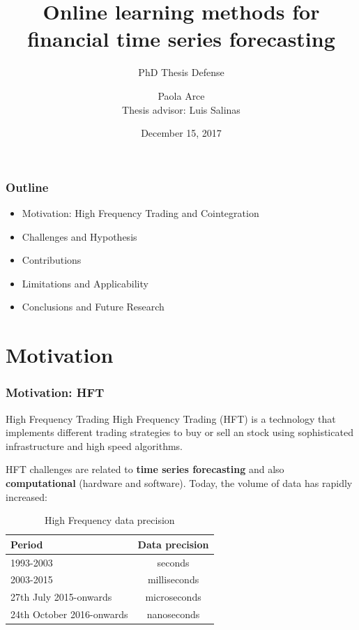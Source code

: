 \documentclass{beamer}
\author[Paola Arce]{Paola Arce \\ Thesis advisor: Luis Salinas}
\date{December 15, 2017}
\title[Thesis defense]{Online learning methods for financial time series forecasting}
\subtitle{PhD Thesis Defense}
\begin{document}
\begin{frame}[plain]
\titlepage
{}

\end{frame}

\begin{frame}
\frametitle{Outline}
\begin{itemize}
\item Motivation: High Frequency Trading and Cointegration
\item Challenges and Hypothesis
\item Contributions
\item Limitations and Applicability
\item Conclusions and Future Research
\end{itemize}
\end{frame}

\section{Motivation}


\begin{frame}
\frametitle{Motivation: HFT}
\begin{alertblock}{High Frequency Trading}
High Frequency Trading (HFT) is a technology that implements different trading strategies to buy or sell an stock using sophisticated infrastructure and high speed algorithms.
\end{alertblock}
HFT challenges are related to {\bf time series forecasting} and also {\bf computational} (hardware and software). Today, the volume of data has rapidly increased:
\begin{table}
\small
\begin{tabular}{ l | c }
Period & Data precision \\
\hline \hline
1993-2003 & seconds \\
2003-2015 & milliseconds \\
27th July 2015-onwards & microseconds \\
24th October 2016-onwards & nanoseconds
\end{tabular}
\caption{High Frequency data precision}
\end{table}
\end{frame}
\end{document}

